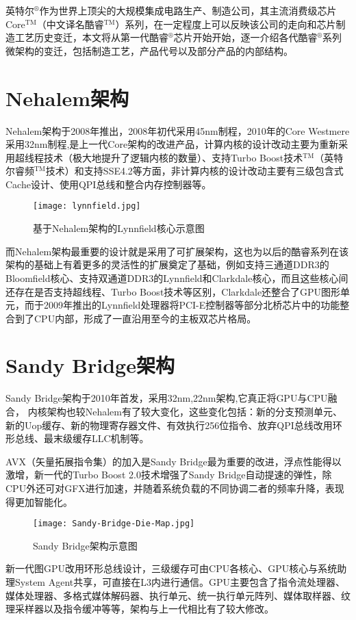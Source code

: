 \documentclass[UTF8]{pkuthss}
\begin{document}
	\maketitle
	\begin{cabstract}
		英特尔$^\circledR$作为世界上顶尖的大规模集成电路生产、制造公司，其主流消费级芯片Core$^\text{TM}$（中文译名酷睿$^\text{TM}$）系列，在一定程度上可以反映该公司的走向和芯片制造工艺历史变迁，本文将从第一代酷睿$^®$芯片开始开始，逐一介绍各代酷睿$^\circledR$系列微架构的变迁，包括制造工艺，产品代号以及部分产品的内部结构。
	\end{cabstract}
	\section{Nehalem架构}
	Nehalem架构于2008年推出，2008年初代采用45nm制程\cite{blog.csdn.net}，2010年的Core Westmere采用32nm制程,是上一代Core架构的改进产品，计算内核的设计改动主要为重新采用超线程技术（极大地提升了逻辑内核的数量）、支持Turbo Boost技术$^\text{TM}$（英特尔睿频$^\text{TM}$技术）和支持SSE4.2等方面，非计算内核的设计改动主要有三级包含式Cache设计、使用QPI总线和整合内存控制器等。\cite{www.expreview.com}
	\begin{figure}[ht]
		\texttt{[image: lynnfield.jpg]}
		\caption{基于Nehalem架构的Lynnfield核心示意图}
	\end{figure}
	
	而Nehalem架构最重要的设计就是采用了可扩展架构，这也为以后的酷睿系列在该架构的基础上有着更多的灵活性的扩展奠定了基础，例如支持三通道DDR3的Bloomfield核心、支持双通道DDR3的Lynnfield和Clarkdale核心，而且这些核心间还存在是否支持超线程、Turbo Boost技术等区别，Clarkdale还整合了GPU图形单元，而于2009年推出的Lynnfield处理器将PCI-E控制器等部分北桥芯片中的功能整合到了CPU内部，形成了一直沿用至今的主板双芯片格局。
	\section{Sandy Bridge架构}
	Sandy Bridge架构于2010年首发，采用32nm,22nm架构\cite{blog.csdn.net},它真正将GPU与CPU融合， 内核架构也较Nehalem有了较大变化，这些变化包括：新的分支预测单元、新的Uop缓存、新的物理寄存器文件、有效执行256位指令、放弃QPI总线改用环形总线、最末级缓存LLC机制等。
	
	AVX（矢量拓展指令集）的加入是Sandy Bridge最为重要的改进，浮点性能得以激增，新一代的Turbo Boost 2.0技术增强了Sandy Bridge自动提速的弹性，除CPU外还可对GFX进行加速，并随着系统负载的不同协调二者的频率升降，表现得更加智能化。
	\begin{figure}[ht]
		\texttt{[image: Sandy-Bridge-Die-Map.jpg]}
		\caption{Sandy Bridge架构示意图}
	\end{figure}
	新一代图GPU改用环形总线设计，三级缓存可由CPU各核心、GPU核心与系统助理System Agent共享，可直接在L3内进行通信。GPU主要包含了指令流处理器、媒体处理器、多格式媒体解码器、执行单元、统一执行单元阵列、媒体取样器、纹理采样器以及指令缓冲等等，架构与上一代相比有了较大修改。
\end{document}
